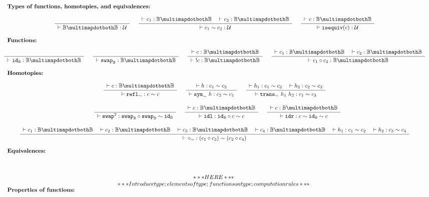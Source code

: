 \documentclass[format=acmlarge,review,natbib]{acmart}
\newcommand{\invc}[1]{!#1}
\newcommand{\compc}{\circ}
\newcommand{\reflh}{\mathtt{refl}_{\sim}}
\newcommand{\symh}[1]{\mathtt{sym}_{\sim}~#1}
\newcommand{\transh}[2]{\mathtt{trans}_{\sim}~#1~#2}
\newcommand{\isequiv}[1]{\mathtt{isequiv}(#1)}
\newcommand{\idc}{\mathtt{id}}
\newcommand{\swapc}{\mathtt{swap}}
\newcommand{\idlc}{\mathtt{idl}}
\newcommand{\idrc}{\mathtt{idr}}
\newcommand{\swapswap}{\swapc^2}
\newcommand{\compsim}{\compc_{\sim}}
\newcommand{\iso}{\multimapdotboth}
\newcommand{\boolt}{\mathbb{B}}
\newcommand{\univ}{\mathcal{U}}
\newcommand{\Rule}[2]{
\makebox{
$\displaystyle
\frac{\begin{array}{l}#1\\\end{array}}
{\begin{array}{l}#2\\\end{array}}$}}
\newcommand{\proves}{\vdash}
\newcommand{\jdg}[3]{#1 \proves #2 : #3}
\begin{document}
\[\begin{array}{c}
\noalign{\textbf{Types of functions, homotopies, and equivalences:}} \\
\Rule{}{\jdg{}{\boolt\iso\boolt}{\univ}}
\quad
\Rule{\jdg{}{c_1}{\boolt\iso\boolt}
         \quad\jdg{}{c_2}{\boolt\iso\boolt}}
        {\jdg{}{c_1 \sim c_2}{\univ}}
\quad
\Rule{\jdg{}{c}{\boolt\iso\boolt}}
        {\jdg{}{\isequiv{c}}{\univ}}
\\
\\
\noalign{\textbf{Functions:}} \\
\Rule{}{\jdg{}{\idc_{\boolt}}{\boolt\iso\boolt}}
\quad
\Rule{}{\jdg{}{\swapc_{\boolt}}{\boolt\iso\boolt}}
\quad
\Rule{\jdg{}{c}{\boolt\iso\boolt}}
        {\jdg{}{\;\invc{c}}{\boolt\iso\boolt}}
\quad
\Rule{\jdg{}{c_1}{\boolt\iso\boolt}
        \quad\jdg{}{c_2}{\boolt\iso\boolt}}
        {\jdg{}{c_1 \compc c_2}{\boolt\iso\boolt}}
\\
\\
\noalign{\textbf{Homotopies:}} \\
\Rule{\jdg{}{c}{\boolt\iso\boolt}}
         {\jdg{}{\reflh}{c \sim c}}
\quad
\Rule{\jdg{}{h}{c_1 \sim c_2}}
        {\jdg{}{\symh{h}}{c_2 \sim c_1}}
\quad
\Rule{\jdg{}{h_1}{c_1 \sim c_2}
         \quad\jdg{}{h_2}{c_2 \sim c_3}}
        {\jdg{}{\transh{h_1}{h_2}}{c_1 \sim c_3}}
\\
\\
\quad
\Rule{}{\jdg{}{\swapswap}{\swapc_{\boolt} \compc \swapc_{\boolt} \sim \idc_{\boolt}}}
\quad
\Rule{\jdg{}{c}{\boolt\iso\boolt}}
        {\jdg{}{\idlc}{\idc_{\boolt} \compc c \sim c}}
\quad
\Rule{\jdg{}{c}{\boolt\iso\boolt}}
        {\jdg{}{\idrc}{c \sim \idc_{\boolt} \sim c}}
\\
\\
\Rule{\jdg{}{c_1}{\boolt\iso\boolt}
         \quad\jdg{}{c_2}{\boolt\iso\boolt}
         \quad\jdg{}{c_3}{\boolt\iso\boolt}
         \quad\jdg{}{c_4}{\boolt\iso\boolt}
         \quad\jdg{}{h_1}{c_1 \sim c_2}
         \quad\jdg{}{h_2}{c_3 \sim c_4}}
        {\jdg{}{\compsim}{(c_1 \compc c_3) \sim (c_2 \compc c_4)}}
\\
\\
\noalign{\textbf{Equivalences:}} \\
\\
\\
***HERE*** \\
*** Introduce type; elements of type; functions on type; computation rules *** \\
\noalign{\textbf{Properties of functions:}} \\

\end{array}\]
\end{document}
